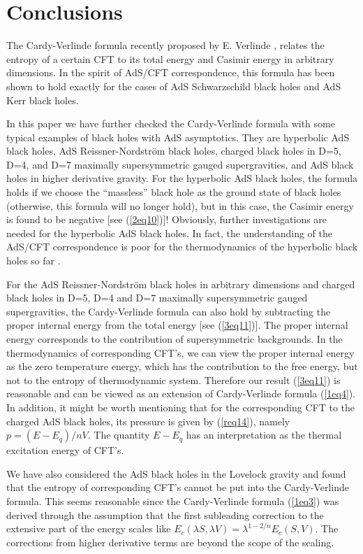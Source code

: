 \documentclass[a4paper,12pt]{article}
\newcommand{\sect}[1]{\setcounter{equation}{0}\section{#1}}
\begin{document}
\sect{Conclusions}

The Cardy-Verlinde formula recently proposed by E. 
Verlinde \cite{Verl}, relates the entropy of a  certain CFT to its 
total energy and Casimir energy in arbitrary dimensions. In the spirit
of AdS/CFT correspondence, this formula has been shown to hold exactly
for the cases of AdS Schwarzschild black holes and AdS Kerr black holes. 

In this paper we have further checked the Cardy-Verlinde formula with some
typical examples of black holes with AdS asymptotics. They are hyperbolic  
AdS black holes, AdS Reissner-Nordstr\"om black holes, charged black holes
in D=5, D=4, and D=7 maximally supersymmetric gauged supergravities, and 
AdS black holes in higher derivative gravity.  For the hyperbolic AdS black 
holes, the formula holds if we choose the ``massless'' black hole as the 
ground state of black holes (otherwise, this formula will no longer hold),
but in this case, the Casimir energy is found to be negative 
[see (\ref{2eq10})]!  Obviously, further investigations are needed for the
hyperbolic AdS black holes. In fact, the understanding of the AdS/CFT 
correspondence is poor  for the thermodynamics of the hyperbolic black 
holes so far \cite{Emp}.  


 For the AdS
Reissner-Nordstr\"om black holes in arbitrary dimensions and charged black 
holes in D=5, D=4 and D=7 maximally supersymmetric gauged supergravities, 
the Cardy-Verlinde formula can also hold by subtracting the proper internal
energy  from the total energy [see (\ref{3eq11})].  The proper internal energy
corresponds to the contribution of supersymmetric backgrounds. In the 
thermodynamics of corresponding CFT's, we can view the proper internal
energy as the zero temperature energy, which has the contribution to the 
free energy, but not to the entropy of thermodynamic system. Therefore our 
result (\ref{3eq11}) is reasonable and can be viewed as an extension of 
Cardy-Verlinde formula (\ref{1eq4}).  In addition, it might be worth 
mentioning that for the corresponding CFT to the charged AdS
black holes, its pressure is given by (\ref{req14}), namely $p=(E-E_q)/nV$.
The quantity $E-E_q$ has an interpretation as the thermal excitation
energy of CFT's.  

We have also considered  the AdS black holes in the Lovelock gravity and found
that the entropy of corresponding CFT's cannot be put into the Cardy-Verlinde
formula. This seems reasonable since the Cardy-Verlinde formula (\ref{1eq3})
was derived through the assumption that the first subleading correction
to the extensive part of the energy scales like $E_c(\lambda S,\lambda V)
=\lambda ^{1-2/n}E_c(S,V)$. The corrections from higher derivative terms
are beyond the scope of the scaling.   
\end{document}

